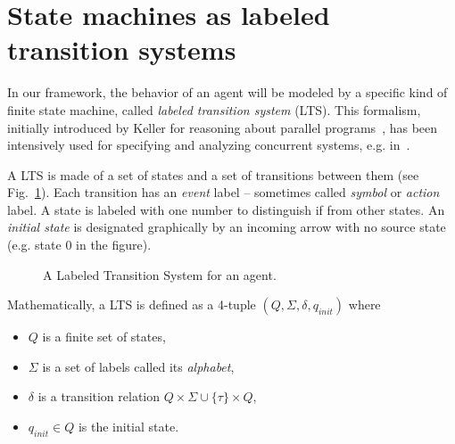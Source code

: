 \section{State machines as labeled transition systems\label{section:background-state-machines}}

In our framework, the behavior of an agent will be modeled by a specific kind of finite state machine, called \emph{labeled transition system} (LTS). This formalism, initially introduced by Keller for reasoning about parallel programs~\cite{Keller:1976}, has been intensively used for specifying and analyzing concurrent systems, e.g. in~\cite{Milner:1989, Clarke:1989, Magee:1997}. 

A LTS is made of a set of states and a set of transitions between them (see Fig.~\ref{image:framework-start-stop}). Each transition has an \emph{event} label -- sometimes called \emph{symbol} or \emph{action} label. A state is labeled with one number to distinguish if from other states. An \emph{initial state} is designated graphically by an incoming arrow with no source state (e.g. state 0 in the figure). 

\vspace{0.5cm}
\begin{figure}[H]
\centering{}
  \caption{A Labeled Transition System for an  agent\label{image:framework-start-stop}.}
\end{figure}

Mathematically, a LTS is defined as a 4-tuple $(Q,\Sigma,\delta,q_{init})$ where 

\begin{itemize}
\item $Q$ is a finite set of states,
\item $\Sigma$ is a set of labels called its \emph{alphabet}, 
\item $\delta$ is a transition relation $Q \times \Sigma\cup\{\tau\} \times Q$,
\item $q_{init} \in Q$ is the initial state. 
\end{itemize}

